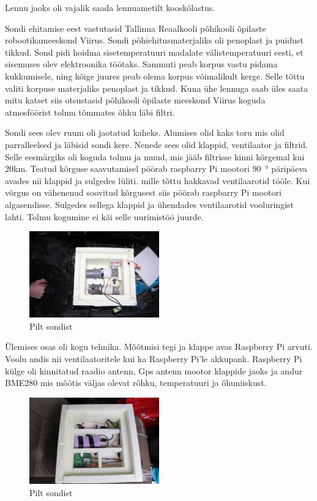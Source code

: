 \documentclass{trkut}%
\begin{document}
Lennu jaoks oli vajalik saada lennuametilt kooskõlastus.

Sondi ehitamise eest vastutasid Tallinna Reaalkooli põhikooli õpilaste robootikameeskond Viirus. Sondi põhiehitusmaterjaliks oli penoplast ja puidust tikkud. Sond pidi hoidma sisetemperatuuri madalate välistemperatuuri eesti, et sisemuses olev elektroonika töötaks. Sammuti peab korpus vastu pidama kukkumisele, ning kõige juures peab olema korpus võimalikult kerge. Selle tõttu valiti korpuse materjaliks penoplast ja tikkud. Kuna ühe lennuga saab üles saata mitu katset siis otsustasid põhikooli õpilaste meeskond Viirus koguda atmosföörist tolmu tõmmates õhku läbi filtri. 

Sondi sees olev ruum oli jaotatud kaheks. Alumises olid kaks toru mis olid parralleelsed ja läbisid sondi kere. Nenede sees olid klappid, ventilaator ja filtrid. Selle eesmärgiks oli koguda tolmu ja muud, mis jääb filtrisse kinni kõrgemal kui 20km. Teatud kõrguse saavutamisel pöörab raspbarry Pi mootori \SI{90}{\degree} päripäeva avades nii klappid ja sulgedes lüliti. mille tõttu hakkavad ventilaarotid tööle. Kui võrgus on vähenenud soovitud kõrgusest siis pöörab raspbarry Pi mootori algasendisse. Sulgedes sellega klappid ja ühendades ventilaarotid vooluringist lahti. Tolmu kogumine ei käi selle uurimistöö juurde.

\begin{figure}[h]
	\includegraphics[width=0.5\textwidth]{PicGra/sond2korrus.jpg}
	\caption{Pilt sondist}
	\label{sond}
\end{figure}

Ülemises osas oli kogu tehnika. Mõõtmisi tegi ja klappe avas Raspberry Pi arvuti. Voolu andis nii ventilaatoritele kui ka Raspberry Pi'le akkupank. Raspberry Pi külge oli kinnitatud raadio antenn, Gps antenn mootor klappide jaoks ja andur BME280 mis mõõtis väljas olevat rõhku, temperatuuri ja õhuniiskust.

\begin{figure}[h]
	\includegraphics[width=0.5\textwidth]{PicGra/sond1korrus1.jpg}
	\caption{Pilt sondist}
	\label{sond}
\end{figure}
\end{document}
